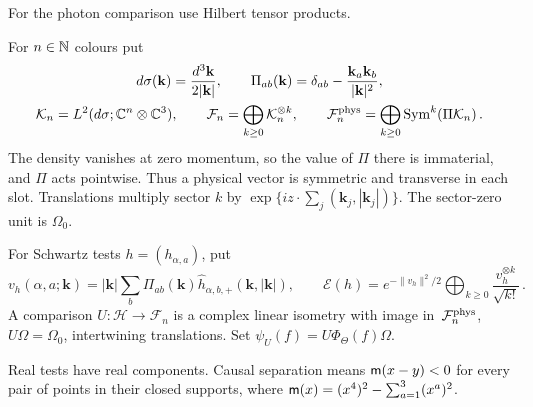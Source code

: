 For the photon comparison use Hilbert tensor products.
\begin{definition}\label{def:D29}
For $n\in\mathbb{N}$ colours put
\begin{gather*}
d\sigma(\mathbf k)=\frac{d^3\mathbf k}{2|\mathbf k|},\qquad
\Pi_{ab}(\mathbf k)=\delta_{ab}-\frac{\mathbf k_a\mathbf k_b}{|\mathbf k|^2},\\
\mathcal K_n=L^2(d\sigma;\mathbb{C}^n\otimes\mathbb{C}^3),\qquad
\mathcal F_n=\bigoplus_{k\ge0}\mathcal K_n^{\otimes k},\qquad
\mathcal F_n^{\rm phys}=\bigoplus_{k\ge0}\operatorname{Sym}^k(\Pi\mathcal K_n)\,.
\end{gather*}
The density vanishes at zero momentum, so the value of $\Pi$ there is immaterial, and $\Pi$ acts pointwise. Thus a physical vector is symmetric and transverse in each slot. Translations multiply sector $k$ by $\exp\{iz\cdot\sum_j(\mathbf k_j,|\mathbf k_j|)\}$. The sector-zero unit is $\Omega_0$.
\end{definition}
\begin{definition}\label{def:D30}
For Schwartz tests $h=(h_{\alpha,a})$, put
\begin{equation*}
v_h(\alpha,a;\mathbf k)=|\mathbf k|\sum_b\Pi_{ab}(\mathbf k)\widehat h_{\alpha,b,+}(\mathbf k,|\mathbf k|),\qquad
\mathcal E(h)=e^{-\|v_h\|^2/2}\bigoplus_{k\ge0}\frac{v_h^{\otimes k}}{\sqrt{k!}}\,.
\end{equation*}
A comparison $U:\mathcal H\to\mathcal F_n$ is a complex linear isometry with image in~$\mathcal F_n^{\rm phys}$, $U\Omega=\Omega_0$, intertwining translations. Set $\psi_U(f)=U\Phi_\Theta(f)\Omega$.
\end{definition}
Real tests have real components. Causal separation means $\mathsf{m}(x-y)<0$ for every pair of points in their closed supports, where $\mathsf{m}(x)=(x^4)^2-\sum_{a=1}^3(x^a)^2$.

